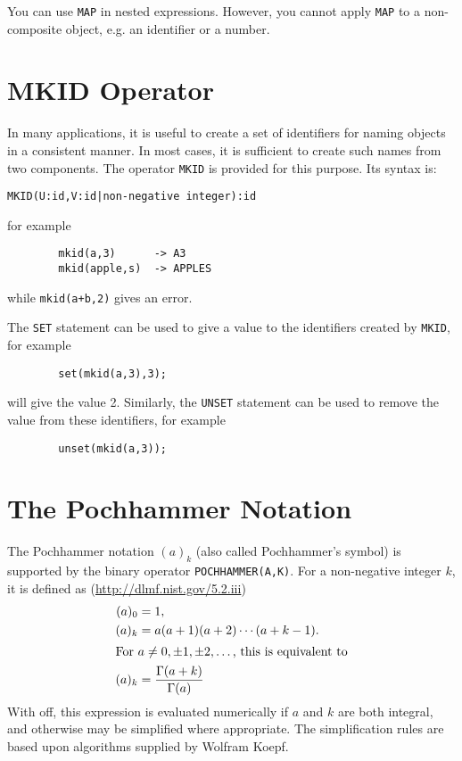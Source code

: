 You can use \texttt{MAP} in nested expressions. However, you cannot
apply \texttt{MAP} to a non-composite object, e.g. an identifier or a number.


\section{MKID Operator}
\hypertarget{operator:MKID}{}
In many applications, it is useful to create a set of identifiers for
naming objects in a consistent manner. In most cases, it is sufficient to
create such names from two components. The operator \texttt{MKID} is provided
for this purpose. Its syntax is:
\begin{verbatim}
MKID(U:id,V:id|non-negative integer):id
\end{verbatim}
for example
\begin{verbatim}
        mkid(a,3)      -> A3
        mkid(apple,s)  -> APPLES
\end{verbatim}
while \texttt{mkid(a+b,2)} gives an error.

The \texttt{SET} statement can be used to give a value to the
identifiers created by \texttt{MKID}, for example
\begin{verbatim}
        set(mkid(a,3),3);
\end{verbatim}
will give  the value 2.
Similarly, the \texttt{UNSET} statement can be used to
remove the value from these identifiers, for example
\begin{verbatim}
        unset(mkid(a,3));
\end{verbatim}


\section{The Pochhammer Notation}
\hypertarget{operator:POCHHAMMER}{}
The Pochhammer notation $(a)_k$ (also called Pochhammer's symbol) is supported by the binary operator \texttt{POCHHAMMER(A,K)}.
For a non-negative integer $k$, it is defined as (\url{http://dlmf.nist.gov/5.2.iii})
\begin{align*}
  (a)_0 &= 1, \\
  (a)_k &= a(a+1)(a+2)\cdots(a+k-1).\\
\intertext{For $a\not=0,\pm1,\pm2,\dots$, this is equivalent to}
  (a)_k &= \frac{\Gamma(a+k)}{\Gamma(a)}
\end{align*}
With  off, this expression is evaluated
numerically if $a$ and $k$ are both integral, and otherwise may be
simplified where appropriate.  The simplification rules are based upon
algorithms supplied by Wolfram Koepf.%


